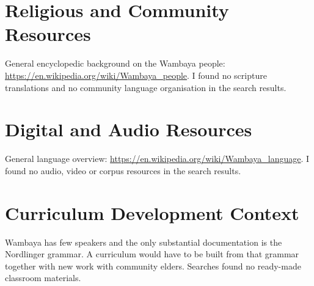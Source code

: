 \documentclass[12pt]{article}
\begin{document}
\section{Religious and Community Resources}
General encyclopedic background on the Wambaya people: \url{https://en.wikipedia.org/wiki/Wambaya_people}. I found no scripture translations and no community language organisation in the search results.

\section{Digital and Audio Resources}
General language overview: \url{https://en.wikipedia.org/wiki/Wambaya_language}. I found no audio, video or corpus resources in the search results.

\section{Curriculum Development Context}
Wambaya has few speakers and the only substantial documentation is the Nordlinger grammar. A curriculum would have to be built from that grammar together with new work with community elders. Searches found no ready-made classroom materials.
\end{document}
